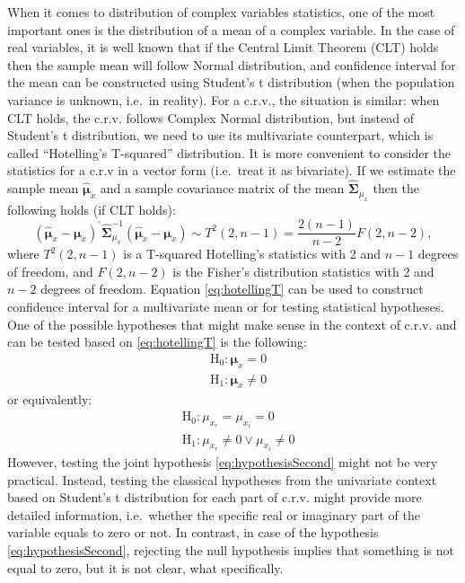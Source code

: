 \documentclass[
]{book}
\begin{document}
When it comes to distribution of complex variables statistics, one of the most important ones is the distribution of a mean of a complex variable. In the case of real variables, it is well known that if the Central Limit Theorem (CLT) holds then the sample mean will follow Normal distribution, and confidence interval for the mean can be constructed using Student's t distribution (when the population variance is unknown, i.e.~in reality). For a c.r.v., the situation is similar: when CLT holds, the c.r.v. follows Complex Normal distribution, but instead of Student's t distribution, we need to use its multivariate counterpart, which is called ``Hotelling's T-squared'' distribution. It is more convenient to consider the statistics for a c.r.v in a vector form (i.e.~treat it as bivariate). If we estimate the sample mean \(\hat{\boldsymbol{\mu}}_x\) and a sample covariance matrix of the mean \(\hat{\boldsymbol{\Sigma}}_{\mu_{x}}\) then the following holds (if CLT holds):
\begin{equation}
    (\hat{\boldsymbol{\mu}}_x - \boldsymbol{\mu}_x)^\prime \hat{\boldsymbol{\Sigma}}_{\mu_{x}}^{-1} (\hat{\boldsymbol{\mu}}_x - \boldsymbol{\mu}_x) \sim T^2(2, n-1) = \frac{2(n-1)}{n-2} F(2, n-2),
    \label{eq:hotellingT}
\end{equation}
where \(T^2(2, n-1)\) is a T-squared Hotelling's statistics with 2 and \(n-1\) degrees of freedom, and \(F(2, n-2)\) is the Fisher's distribution statistics with 2 and \(n-2\) degrees of freedom. Equation \eqref{eq:hotellingT} can be used to construct confidence interval for a multivariate mean or for testing statistical hypotheses. One of the possible hypotheses that might make sense in the context of c.r.v. and can be tested based on \eqref{eq:hotellingT} is the following:
\begin{equation}
    \begin{aligned}
        & \mathrm{H}_0: \boldsymbol{\mu}_x = 0 \\
        & \mathrm{H}_1: \boldsymbol{\mu}_x \neq 0
    \end{aligned}
    \label{eq:hypothesisFirst}
\end{equation}
or equivalently:
\begin{equation}
    \begin{aligned}
        & \mathrm{H}_0: \mu_{x_r} = \mu_{x_i} = 0 \\
        & \mathrm{H}_1: \mu_{x_r} \neq 0 \vee \mu_{x_i} \neq 0
    \end{aligned}
    \label{eq:hypothesisSecond}
\end{equation}
However, testing the joint hypothesis \eqref{eq:hypothesisSecond} might not be very practical. Instead, testing the classical hypotheses from the univariate context based on Student's t distribution for each part of c.r.v. might provide more detailed information, i.e.~whether the specific real or imaginary part of the variable equals to zero or not. In contrast, in case of the hypothesis \eqref{eq:hypothesisSecond}, rejecting the null hypothesis implies that something is not equal to zero, but it is not clear, what specifically.
\end{document}
